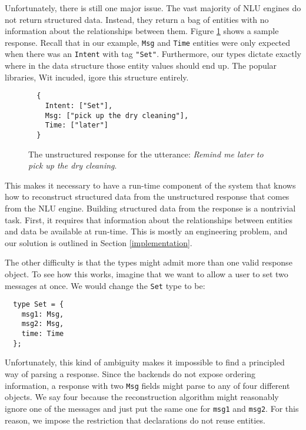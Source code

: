 \documentclass[twocolumn]{article}
\newcommand{\ts}[1]{\texttt{#1}}
\begin{document}
Unfortunately, there is still one major issue. The vast majority of NLU engines
do not return structured data. Instead, they return a bag of entities with no
information about the relationships between them. Figure \ref{fig:nostructure}
shows a sample response. Recall that in our example, \ts{Msg} and \ts{Time}
entities were only expected when there was an \ts{Intent} with tag \ts{"Set"}.
Furthermore, our types dictate exactly where in the data structure those entity
values should end up. The popular libraries, Wit incuded, igore this structure
entirely.

\begin{figure}
\begin{verbatim}
  {
    Intent: ["Set"],
    Msg: ["pick up the dry cleaning"],
    Time: ["later"]
  }
\end{verbatim}
  \caption{The unstructured response for the utterance: \emph{Remind me later to
      pick up the dry cleaning}.}
  \label{fig:nostructure}
\end{figure}

This makes it necessary to have a run-time component of the system that knows
how to reconstruct structured data from the unstructured response that comes
from the NLU engine. Building structured data from the response is a nontrivial
task. First, it requires that information about the relationships between
entities and data be available at run-time. This is mostly an engineering
problem, and our solution is outlined in Section \ref{implementation}.

The other difficulty is that the types might admit more than one valid response
object. To see how this works, imagine that we want to allow a user to set two
messages at once. We would change the \ts{Set} type to be:
\begin{verbatim}
  type Set = {
    msg1: Msg,
    msg2: Msg,
    time: Time
  };
\end{verbatim}
Unfortunately, this kind of ambiguity makes it impossible to find a principled
way of parsing a response. Since the backends do not expose ordering
information, a response with two \ts{Msg} fields might parse to any of four
different objects. We say four because the reconstruction algorithm might
reasonably ignore one of the messages and just put the same one for \ts{msg1}
and \ts{msg2}. For this reason, we impose the restriction that declarations do
not reuse entities.
\end{document}
